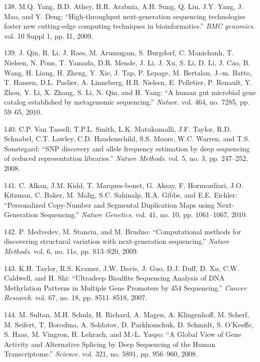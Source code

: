 \documentclass[12pt,a4paper,twoside]{ugathesis}
\theoremstyle{definition}
\theoremstyle{definition}
\theoremstyle{definition}
\theoremstyle{remark}
\begin{document}
\hypertarget{ref-Yang2009}{}
138. M.Q. Yang, B.D. Athey, H.R. Arabnia, A.H. Sung, Q. Liu, J.Y. Yang,
J. Mao, and Y. Deng: ``High-throughput next-generation sequencing
technologies foster new cutting-edge computing techniques in
bioinformatics.'' \emph{BMC genomics}. vol. 10 Suppl 1, pp. I1, 2009.

\hypertarget{ref-Qin2010}{}
139. J. Qin, R. Li, J. Raes, M. Arumugam, S. Burgdorf, C. Manichanh, T.
Nielsen, N. Pons, T. Yamada, D.R. Mende, J. Li, J. Xu, S. Li, D. Li, J.
Cao, B. Wang, H. Liang, H. Zheng, Y. Xie, J. Tap, P. Lepage, M.
Bertalan, J.-m. Batto, T. Hansen, D.L. Paslier, A. Linneberg, H.B.
Nielsen, E. Pelletier, P. Renault, Y. Zhou, Y. Li, X. Zhang, S. Li, N.
Qin, and H. Yang: ``A human gut microbial gene catalog established by
metagenomic sequencing.'' \emph{Nature}. vol. 464, no. 7285, pp. 59--65,
2010.

\hypertarget{ref-VanTassell2008}{}
140. C.P. Van Tassell, T.P.L. Smith, L.K. Matukumalli, J.F. Taylor, R.D.
Schnabel, C.T. Lawley, C.D. Haudenschild, S.S. Moore, W.C. Warren, and
T.S. Sonstegard: ``SNP discovery and allele frequency estimation by deep
sequencing of reduced representation libraries.'' \emph{Nature Methods}.
vol. 5, no. 3, pp. 247--252, 2008.

\hypertarget{ref-Alkan2010}{}
141. C. Alkan, J.M. Kidd, T. Marques-bonet, G. Aksay, F. Hormozdiari,
J.O. Kitzman, C. Baker, M. Malig, S.C. Sahinalp, R.A. Gibbs, and E.E.
Eichler: ``Personalized Copy-Number and Segmental Duplication Maps using
Next-Generation Sequencing.'' \emph{Nature Genetics}. vol. 41, no. 10,
pp. 1061--1067, 2010.

\hypertarget{ref-Medvedev2009}{}
142. P. Medvedev, M. Stanciu, and M. Brudno: ``Computational methods for
discovering structural variation with next-generation sequencing.''
\emph{Nature Methods}. vol. 6, no. 11s, pp. S13--S20, 2009.

\hypertarget{ref-Taylor2007}{}
143. K.H. Taylor, R.S. Kramer, J.W. Davis, J. Guo, D.J. Duff, D. Xu,
C.W. Caldwell, and H. Shi: ``Ultradeep Bisulfite Sequencing Analysis of
DNA Methylation Patterns in Multiple Gene Promoters by 454 Sequencing.''
\emph{Cancer Research}. vol. 67, no. 18, pp. 8511--8518, 2007.

\hypertarget{ref-Sultan2008}{}
144. M. Sultan, M.H. Schulz, H. Richard, A. Magen, A. Klingenhoff, M.
Scherf, M. Seifert, T. Borodina, A. Soldatov, D. Parkhomchuk, D.
Schmidt, S. O'Keeffe, S. Haas, M. Vingron, H. Lehrach, and M.-L. Yaspo:
``A Global View of Gene Activity and Alternative Splicing by Deep
Sequencing of the Human Transcriptome.'' \emph{Science}. vol. 321, no.
5891, pp. 956--960, 2008.
\end{document}
